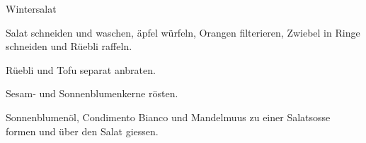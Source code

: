 
\begin{recipe}[]{Wintersalat}{}{}




\step
Salat schneiden und waschen, \"apfel w\"urfeln, Orangen filterieren, Zwiebel in Ringe schneiden und R\"uebli raffeln.

\step
R\"uebli und Tofu separat anbraten.

\step
Sesam- und Sonnenblumenkerne r\"osten.


\step
Sonnenblumen\"ol, Condimento Bianco und Mandelmuus zu einer Salatsosse formen und \"uber den Salat giessen.


\end{recipe}
